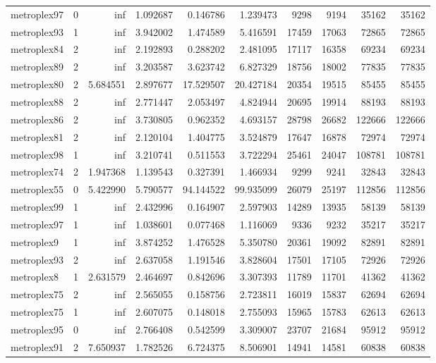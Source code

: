 \begin{longtable}{|l|r|r|r|r|r|r|r|r|r|}
metroplex97 & 0 & inf & 1.092687 & 0.146786 & 1.239473 & 9298 & 9194 & 35162 & 35162 \\
metroplex93 & 1 & inf & 3.942002 & 1.474589 & 5.416591 & 17459 & 17063 & 72865 & 72865 \\
metroplex84 & 2 & inf & 2.192893 & 0.288202 & 2.481095 & 17117 & 16358 & 69234 & 69234 \\
metroplex89 & 2 & inf & 3.203587 & 3.623742 & 6.827329 & 18756 & 18002 & 77835 & 77835 \\
metroplex80 & 2 & 5.684551 & 2.897677 & 17.529507 & 20.427184 & 20354 & 19515 & 85455 & 85455 \\
metroplex88 & 2 & inf & 2.771447 & 2.053497 & 4.824944 & 20695 & 19914 & 88193 & 88193 \\
metroplex86 & 2 & inf & 3.730805 & 0.962352 & 4.693157 & 28798 & 26682 & 122666 & 122666 \\
metroplex81 & 2 & inf & 2.120104 & 1.404775 & 3.524879 & 17647 & 16878 & 72974 & 72974 \\
metroplex98 & 1 & inf & 3.210741 & 0.511553 & 3.722294 & 25461 & 24047 & 108781 & 108781 \\
metroplex74 & 2 & 1.947368 & 1.139543 & 0.327391 & 1.466934 & 9299 & 9241 & 32843 & 32843 \\
metroplex55 & 0 & 5.422990 & 5.790577 & 94.144522 & 99.935099 & 26079 & 25197 & 112856 & 112856 \\
metroplex99 & 1 & inf & 2.432996 & 0.164907 & 2.597903 & 14289 & 13935 & 58139 & 58139 \\
metroplex97 & 1 & inf & 1.038601 & 0.077468 & 1.116069 & 9336 & 9232 & 35217 & 35217 \\
metroplex9 & 1 & inf & 3.874252 & 1.476528 & 5.350780 & 20361 & 19092 & 82891 & 82891 \\
metroplex93 & 2 & inf & 2.637058 & 1.191546 & 3.828604 & 17501 & 17105 & 72926 & 72926 \\
metroplex8 & 1 & 2.631579 & 2.464697 & 0.842696 & 3.307393 & 11789 & 11701 & 41362 & 41362 \\
metroplex75 & 2 & inf & 2.565055 & 0.158756 & 2.723811 & 16019 & 15837 & 62694 & 62694 \\
metroplex75 & 1 & inf & 2.607075 & 0.148018 & 2.755093 & 15965 & 15783 & 62613 & 62613 \\
metroplex95 & 0 & inf & 2.766408 & 0.542599 & 3.309007 & 23707 & 21684 & 95912 & 95912 \\
metroplex91 & 2 & 7.650937 & 1.782526 & 6.724375 & 8.506901 & 14941 & 14581 & 60838 & 60838 \\

\end{longtable}
